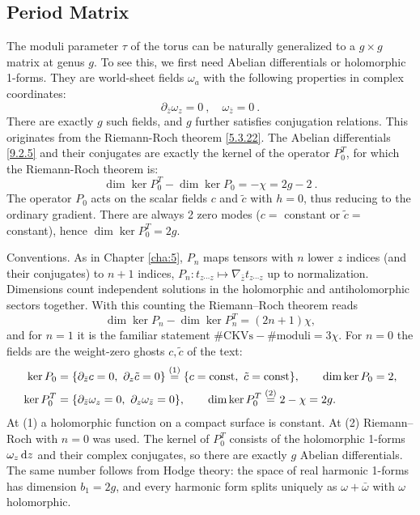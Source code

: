 \subsection*{Period Matrix}
The moduli parameter $\tau$ of the torus can be naturally generalized to a $g \times g$ matrix at genus $g$. To see this, we first need Abelian differentials or holomorphic 1-forms. 
They are world-sheet fields $\omega_{a}$ with the following properties in complex coordinates:
\begin{equation}
	\partial_{\bar{z}} \omega_{z} = 0 \:, \quad \omega_{\bar{z}} = 0 \:.
	\label{9.2.5}
\end{equation}
There are exactly $g$ such fields, and $g$ further satisfies conjugation relations. This originates from the Riemann-Roch theorem \eqref{5.3.22}. The Abelian differentials \eqref{9.2.5} and their conjugates are exactly the kernel of the operator $P_{0}^{T}$, 
for which the Riemann-Roch theorem is:
\begin{equation}
	\operatorname{dim} \operatorname{ker} P_{0}^{T}-\operatorname{dim} \operatorname{ker} P_{0}=-\chi=2 g-2 \:.
	\label{9.2.6}
\end{equation}
The operator $P_{0}$ acts on the scalar fields $c$ and $\tilde{c}$ with $h=0$, thus reducing to the ordinary gradient. There are always 2 zero modes ($c=$ constant or $\tilde{c}=$ constant), 
hence $\operatorname{dim}\operatorname{ker}P_{0}^{T}=2g$.
\begin{tcolorbox}[breakable]
	\begin{remark}
		Conventions. As in Chapter \ref{cha:5}, $P_n$ maps tensors with $n$ lower $z$ indices (and their conjugates) to $n+1$ indices, $P_n\colon t_{z\cdots z}\mapsto\nabla_{\bar z}t_{z\cdots z}$ up to normalization. Dimensions count independent solutions in the holomorphic and antiholomorphic sectors together. With this counting the Riemann--Roch theorem reads
		\begin{equation*}
			\dim\ker P_n-\dim\ker P_n^T=(2n+1)\chi ,
		\end{equation*}
		and for $n=1$ it is the familiar statement $\#\text{CKVs}-\#\text{moduli}=3\chi$. For $n=0$ the fields are the weight-zero ghosts $c,\tilde c$ of the text:
		\begin{align*}
			\ker P_0&=\{\partial_{\bar z}c=0,\ \partial_z\tilde c=0\}\eqs{1}\{c=\text{const},\ \tilde c=\text{const}\},\qquad\dim\ker P_0=2,\\
			\ker P_0^T&=\{\partial_{\bar z}\omega_z=0,\ \partial_z\omega_{\bar z}=0\},\qquad
			\dim\ker P_0^T\eqs{2}2-\chi=2g .
		\end{align*}
		At (1) a holomorphic function on a compact surface is constant. At (2) Riemann--Roch with $n=0$ was used. The kernel of $P_0^T$ consists of the holomorphic 1-forms $\omega_z\,\mathrm{d} z$ and their complex conjugates, so there are exactly $g$ Abelian differentials. The same number follows from Hodge theory: the space of real harmonic 1-forms has dimension $b_1=2g$, and every harmonic form splits uniquely as $\omega+\bar\omega$ with $\omega$ holomorphic.
	\end{remark}
\end{tcolorbox}

